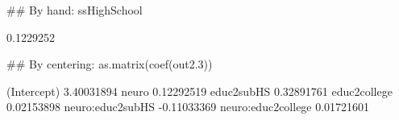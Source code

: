 \begin{Schunk}
\begin{Sinput}
 ## By hand:
 ssHighSchool
\end{Sinput}
\begin{Soutput}
[1] 0.1229252
\end{Soutput}
\begin{Sinput}
 ## By centering:
 as.matrix(coef(out2.3))
\end{Sinput}
\begin{Soutput}
                          [,1]
(Intercept)         3.40031894
neuro               0.12292519
educ2subHS          0.32891761
educ2college        0.02153898
neuro:educ2subHS   -0.11033369
neuro:educ2college  0.01721601
\end{Soutput}
\end{Schunk}

